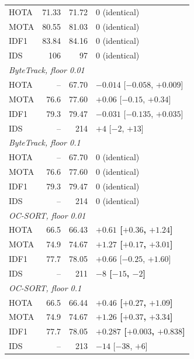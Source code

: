 \begin{table}[tbp]
\begin{tabular}{lrrl}
\quad HOTA & 71.33 & 71.72 & 0 (identical)\\
\quad MOTA & 80.55 & 81.03 & 0 (identical)\\
\quad IDF1 & 83.84 & 84.16 & 0 (identical)\\
\quad IDS & 106 & 97 & 0 (identical)\\
\multicolumn{4}{l}{\textit{ByteTrack, floor 0.01} \cite{zhang2022bytetrack}}\\
\quad HOTA & -- & 67.70 & $-0.014$ [$-0.058$, $+0.009$]\\
\quad MOTA & 76.6 & 77.60 & $+0.06$ [$-0.15$, $+0.34$]\\
\quad IDF1 & 79.3 & 79.47 & $-0.031$ [$-0.135$, $+0.035$]\\
\quad IDS & -- & 214 & $+4$ [$-2$, $+13$]\\
\multicolumn{4}{l}{\textit{ByteTrack, floor 0.1} \cite{zhang2022bytetrack}}\\
\quad HOTA & -- & 67.70 & 0 (identical)\\
\quad MOTA & 76.6 & 77.60 & 0 (identical)\\
\quad IDF1 & 79.3 & 79.47 & 0 (identical)\\
\quad IDS & -- & 214 & 0 (identical)\\
\multicolumn{4}{l}{\textit{OC-SORT, floor 0.01} \cite{cao2023ocsort}}\\
\quad HOTA & 66.5 & 66.43 & \textbf{$+0.61$ [$+0.36$, $+1.24$]}\\
\quad MOTA & 74.9 & 74.67 & \textbf{$+1.27$ [$+0.17$, $+3.01$]}\\
\quad IDF1 & 77.7 & 78.05 & $+0.66$ [$-0.25$, $+1.60$]\\
\quad IDS & -- & 211 & \textbf{$-8$ [$-15$, $-2$]}\\
\multicolumn{4}{l}{\textit{OC-SORT, floor 0.1} \cite{cao2023ocsort}}\\
\quad HOTA & 66.5 & 66.44 & \textbf{$+0.46$ [$+0.27$, $+1.09$]}\\
\quad MOTA & 74.9 & 74.67 & \textbf{$+1.26$ [$+0.37$, $+3.34$]}\\
\quad IDF1 & 77.7 & 78.05 & \textbf{$+0.287$ [$+0.003$, $+0.838$]}\\
\quad IDS & -- & 213 & $-14$ [$-38$, $+6$]\\
\bottomrule
\end{tabular}
\end{table}

